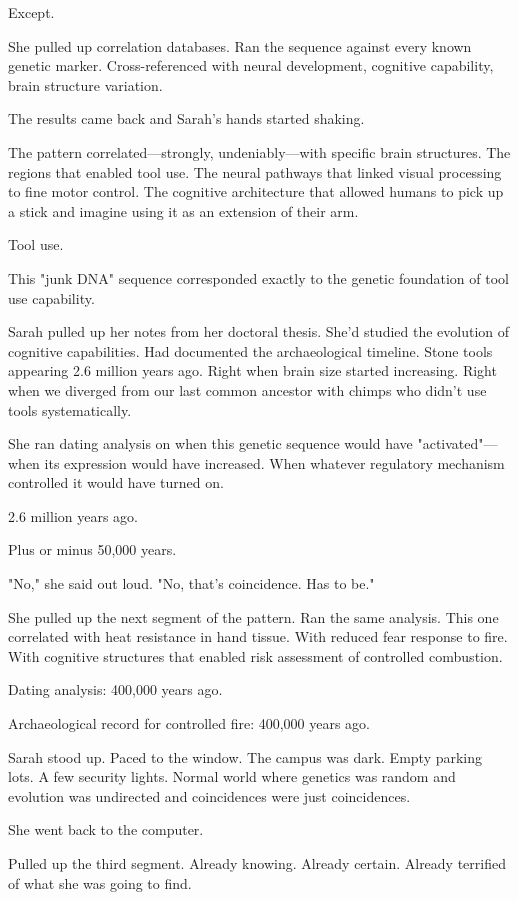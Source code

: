 Except.

She pulled up correlation databases. Ran the sequence against every known genetic marker. Cross-referenced with neural development, cognitive capability, brain structure variation.

The results came back and Sarah's hands started shaking.

The pattern correlated—strongly, undeniably—with specific brain structures. The regions that enabled tool use. The neural pathways that linked visual processing to fine motor control. The cognitive architecture that allowed humans to pick up a stick and imagine using it as an extension of their arm.

Tool use.

This "junk DNA" sequence corresponded exactly to the genetic foundation of tool use capability.

Sarah pulled up her notes from her doctoral thesis. She'd studied the evolution of cognitive capabilities. Had documented the archaeological timeline. Stone tools appearing 2.6 million years ago. Right when brain size started increasing. Right when we diverged from our last common ancestor with chimps who didn't use tools systematically.

She ran dating analysis on when this genetic sequence would have "activated"—when its expression would have increased. When whatever regulatory mechanism controlled it would have turned on.

2.6 million years ago.

Plus or minus 50,000 years.

"No," she said out loud. "No, that's coincidence. Has to be."

She pulled up the next segment of the pattern. Ran the same analysis. This one correlated with heat resistance in hand tissue. With reduced fear response to fire. With cognitive structures that enabled risk assessment of controlled combustion.

Dating analysis: 400,000 years ago.

Archaeological record for controlled fire: 400,000 years ago.

Sarah stood up. Paced to the window. The campus was dark. Empty parking lots. A few security lights. Normal world where genetics was random and evolution was undirected and coincidences were just coincidences.

She went back to the computer.

Pulled up the third segment. Already knowing. Already certain. Already terrified of what she was going to find.

